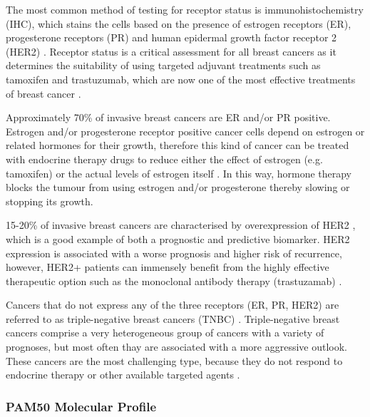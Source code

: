     The most common method of testing for receptor status is immunohistochemistry (IHC), which stains the cells based on the presence of estrogen receptors (ER), progesterone receptors (PR) and  human epidermal growth factor receptor 2 (HER2) \cite{Zaha2014}. Receptor status is a critical assessment for all breast cancers as it determines the suitability of using targeted adjuvant treatments such as tamoxifen and trastuzumab, which are now one of the most effective treatments of breast cancer \cite{stickeler2011prognostic}. 

    Approximately 70\% of invasive breast cancers are ER and/or PR positive. Estrogen and/or progesterone receptor positive cancer cells depend on estrogen or related hormones for their growth, therefore this kind of cancer can be treated with endocrine therapy drugs to reduce either the effect of estrogen (e.g. tamoxifen) or the actual levels of estrogen itself \cite{early2005effects}. In this way, hormone therapy blocks the tumour from using estrogen and/or progesterone thereby slowing or stopping its growth. 

    15-20\% of invasive breast cancers are characterised by overexpression of HER2  \cite{stickeler2011prognostic}, which is a good example of both a prognostic and predictive biomarker. HER2 expression is associated with a worse prognosis and higher risk of recurrence, however, HER2+ patients can immensely benefit from the highly effective therapeutic option such as the monoclonal antibody therapy (trastuzamab) \cite{iqbal2014human}. 

    Cancers that do not express any of the three receptors (ER, PR, HER2) are referred to as triple-negative breast cancers (TNBC) \cite{foulkes2010triple}. Triple-negative breast cancers comprise a very heterogeneous group of cancers with a variety of prognoses, but most often thay are associated with a more aggressive outlook. These cancers are the most challenging type, because they do not respond to endocrine therapy or other available targeted agents \cite{hudis2011triple}. 

    
    
    
    
    
    
    
            
 
            
    \subsubsection{PAM50 Molecular Profile}
    

